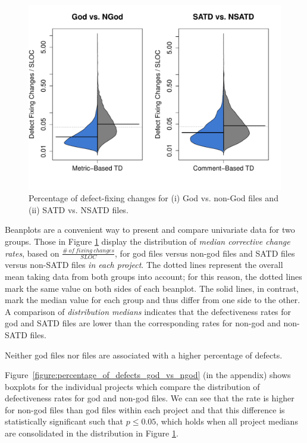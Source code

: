 \begin{figure}[h]
	\centering
	\includegraphics[width=140mm]{figures/chapter4/rq1_defectivness_distrubution_new2}
	\caption{Percentage of defect-fixing changes for (i) God vs. non-God files and (ii) SATD vs. NSATD files.}
	\label{figure:ch4_number_of_fixing_changes_TD_vs_NTD}
\end{figure}

Beanplots are a convenient way to present and compare univariate data for two groups. Those in Figure \ref{figure:ch4_number_of_fixing_changes_TD_vs_NTD} display the distribution of \textit{median corrective change rates}, based on $\frac{ \#~of~fixing~changes}{SLOC}$, for god files versus non-god files and SATD files versus non-SATD files \textit{in each project}. %
The dotted lines represent the overall mean taking data from both groups into account; for this reason, the dotted lines mark the same value on both sides of each beanplot. The solid lines, in contrast, mark the median value for each group and thus differ from one side to the other. A comparison of \textit{distribution medians} indicates that the defectiveness rates for god and SATD files are lower than the corresponding rates for non-god and non-SATD files.

\begin{myboxii}
	Neither god files nor \SATD files are associated with a higher percentage of defects.
\end{myboxii}

Figure~\ref{figure:percentage_of_defects_god_vs_ngod} (in the appendix) shows boxplots for the individual projects which compare the distribution of defectiveness rates for god and non-god files. We can see that the rate is higher for non-god files than god files within each project and that this difference is statistically significant such that $p \le 0.05$, which holds when all project medians are consolidated in the distribution in Figure \ref{figure:ch4_number_of_fixing_changes_TD_vs_NTD}.

